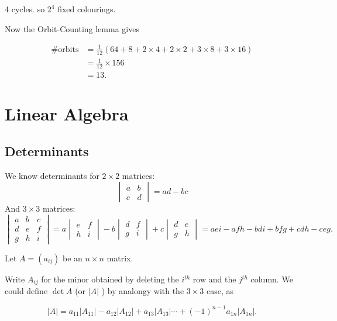 \documentclass{article}
\theoremstyle{definition} \newtheorem*{definition}{Definition}
\begin{document}
\begin{exmps}
\begin{itemize}
\begin{figure}[h]
         \label{fig:necklace1} \end{figure}
       

       4 cycles. so $2^4$ fixed colourings.

       
       Now the Orbit-Counting lemma gives

       \begin{align*} \# \text{orbits} &= \frac{1}{12}(64 + 8 + 2\times4 +
         2\times 2 + 3 \times 8 + 3 \times 16)\\ &= \frac{1}{12}\times 156 \\
         &= 13.  \end{align*} \end{itemize} \end{exmps}

\section{Linear Algebra} \subsection{Determinants} We know determinants for $2
\times 2$ matrices: \[ \begin{vmatrix} a & b \\ c & d \end{vmatrix} = ad - bc
\] And $3 \times 3$ matrices: \[ \begin{vmatrix} a & b & c \\ d & e & f \\ g &
    h & i \end{vmatrix} = a \begin{vmatrix} e & f \\ h & i \end{vmatrix} -
b\begin{vmatrix} d & f \\ g & i \end{vmatrix} + c\begin{vmatrix} d & e \\ g & h
\end{vmatrix} = aei - afh - bdi +bfg +cdh-ceg.  \]

Let $A=(a_{ij})$  be an $n \times n$ matrix.

Write $A_{ij}$ for the minor obtained by deleting the $i^{th}$ row and the
$j^{th}$ column. We could define $\det A$ (or $|A|$ ) by analongy with the $3
\times 3$ case, as

\[ |A| = a_{11}|A_{11}| - a_{12}|A_{12}| + a_{13}|A_{13}| \cdots +
(-1)^{n-1}a_{1n}|A_{1n}|.  \]
\end{document}
